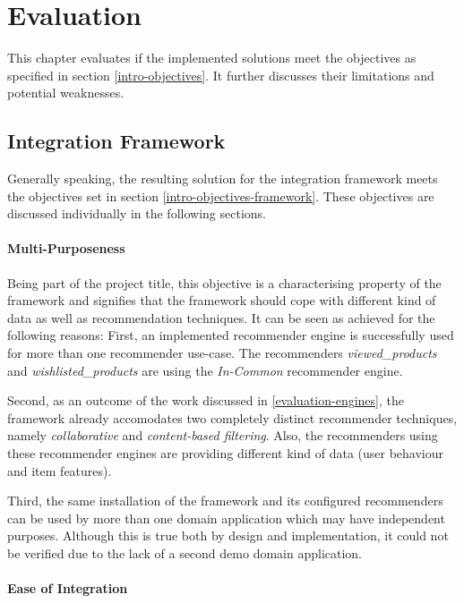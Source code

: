 \chapter{Evaluation}

This chapter evaluates if the implemented solutions meet the objectives as specified in section \ref{intro-objectives}. It further discusses their limitations and potential weaknesses.

\section{Integration Framework}
\label{evaluation-framework}

Generally speaking, the resulting solution for the integration framework meets the objectives set in section \ref{intro-objectives-framework}. These objectives are discussed individually in the following sections.

\subsubsection{Multi-Purposeness}
\label{evaluation-framework-multipurposeness}

Being part of the project title, this objective is a characterising property of the framework and signifies that the framework should cope with different kind of data as well as recommendation techniques. It can be seen as achieved for the following reasons: First, an implemented recommender engine is successfully used for more than one recommender use-case. The recommenders \emph{viewed_products} and \emph{wishlisted_products} are using the \emph{In-Common} recommender engine.

Second, as an outcome of the work discussed in \ref{evaluation-engines}, the framework already accomodates two completely distinct recommender techniques, namely \emph{collaborative} and \emph{content-based filtering}. Also, the recommenders using these recommender engines are providing different kind of data (user behaviour and item features).

Third, the same installation of the framework and its configured recommenders can be used by more than one domain application which may have independent purposes. Although this is true both by design and implementation, it could not be verified due to the lack of a second demo domain application.

\subsubsection{Ease of Integration}

